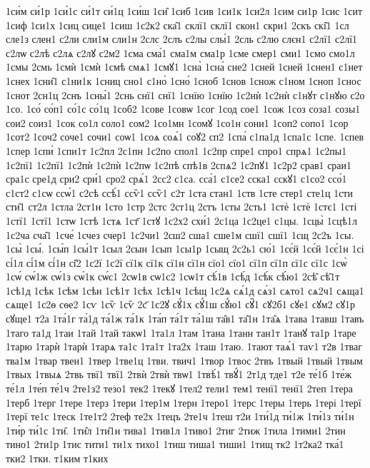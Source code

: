 {1си́м
си́1р
1си́1с
си́1т
си́1ц
1си́ш
1си̑
1сиб
1сив
1си1к
1си2л
1сим
си1р
1сис
1сит
1сиф
1си1х
1сиц
сице1
1сиш
1с2к2
ска̑1
склї1
склї1
скон1
скри1
2скъ
скі̑1
1сл
сле1з
слен1
с2ли
сли1м
сли1н
2слс
2слъ
с2лы
слы́1
2сль
с2лю
слєн1
с2лї1
с2лї1
с2лѡ
с2лѣ
с2лѧ
с2лꙋ
с2м2
1сма
сма́1
сма1м
сма1р
1сме
смер1
сми1
1смо
смо1л
1смы
2смь
1смѝ
1смѝ
1смѣ
смѧ1
1смꙋ1
1сна̀
1сна́
сне2
1сней
1сней
1снен1
с1нет
1снех
1сни̑1
с1ни1к
1сниц
сно1
с1но̀
1сно́
1сноб
1снов
1снож
с1ном
1сноп
1снос
1снот
2сн1ц
2снъ
1сны́1
2снь
снї1
снї1
1снїю
1снїю
1с2нѝ
1с2нѝ
с1нꙋт
с1нꙋю
с2о
1со.
1со́
со́п1
со́1с
со́1ц
1соб2
1сове
1совѡ
1сог
1сод
сое1
1сож
1соз
соза1
созы1
сои2
соиз1
1сок
со1л
соло1
сом2
1со1мн
1сомꙋ
1со1н
сони1
1соп2
сопо1
1сор
1сот2
1соч2
соче1
сочи1
соѡ1
1соѧ
соѧ́1
соꙋ2
сп2
1спа́
с1па1д
1спа1с
1спе.
1спев
1спер
1спи́
1спи1т
1с2пл
2с1пн
1с2по
спол1
1с2пр
спре1
спро1
спрѧ1
1с2пы1
1с2пї1
1с2пї1
1с2пѝ
1с2пѝ
1с2пѡ
1с2пѣ
спѣ1в
2спѧ2
1с2пꙋ1
1с2р2
срав1
сраи1
сра1с
сре1д
сри2
сри́1
сро2
срѧ́1
2сс2
с1са.
сса́1
с1се2
сска1
сскꙋ1
с1со2
ссо́1
с1ст2
с1сѡ
ссѡ́1
с2сѣ
ссѣ́1
ссѷ1
ссѷ1
с2т
1ста
стан1
1ств
1сте
стер1
сте1ц
1сти
сти̑1
ст2л
1стла
2ст1н
1сто
1стр
2стс
2ст1ц
2стъ
1сты
2сть1
1стѐ
1стѐ
1стє1
1сті
1стї1
1стї1
1стѡ
1стѣ
1стѧ
1ст҃
1стꙋ
1с2х2
схи́1
2с1ца
1с2це1
с1цы.
1сцы̀
1сцѣ1л
1с2ча
сча̑1
1сче́
1счез
счер1
1с2чи1
2сш2
сша1
сше1м
сшї1
сшї1
1сщ
2с2ъ
1сы.
1сы̀
1сы́.
1сы́п
1сы́1т
1сыл
2сын
1сып
1сы1р
1сыщ
2с2ь1
сю́1
1сє́й
1сє́й
1сє́1н
1сі
сі́1л
сі́1м
сі́1н
сі̑2
1с2ї
1с2ї
сї1к
сї1к
сї1н
сї1н
сїо1
сїо1
сї1п
сї1п
сї1с
сї1с
1сѡ̀
1сѡ́
сѡ́1ж
сѡ́1з
сѡ́1к
сѡ́с1
2сѡ1в
сѡ1с2
1сѡ1т
сѣ́1в
1сѣ́д
1сѣ́к
сѣ́ю1
2сѣ̑
сѣ̑1т
1сѣ1д
1сѣк
1сѣм
1сѣн
1сѣ1т
1сѣх
1сѣ1ч
1сѣщ
1с2ѧ
сѧ́1д
сѧ́з1
сѧто1
сѧ2ч1
сѧща1
сѧще1
1с2ѳ
сѳе2
1сѵ
1сѷ
1сѷ
2с҃
1с2ꙋ
сꙋ́1х
сꙋ́1ш
сꙋ́ю1
сꙋ̑1
сꙋ2б1
сꙋе1
сꙋм2
сꙋ1р
сꙋще1
т2а
1та́1г
та́1д
та́1ж
та́1к
1та́п
та́1т
та́1ш
та̑в1
та̑1н
1та̑ѧ
1тава
1тавш
1тавъ
1таго
та1д
1таи
1тай
1тай
такѡ1
1та1л
1там
1тана
1танн
тан1т
1танꙋ
та1р
1таре
1тарю
1тарѝ
1тарѝ
1тарѧ
та1с
1та1т
1та2х
1таш
1таю.
1тают
таѧ́1
таѵ1
т2в
1тваг
тва1м
1твар
твен1
1твер
1тве1ц
1тви.
твич1
1твор
1твос
2твъ
1твый
1твый
1твым
1твых
1твыѧ
2твь
твї1
твї1
2твѝ
2твѝ
твѡ1
1твѣ́1
твꙋ́1
2т1д
тде1
т2е
те́1б
1те́ж
те́1л
1те́п
те́1ч
2те1з2
тезо1
тек2
1текꙋ
1тел2
тели1
тем1
тенї1
тенї1
2теп
1тера
1терб
1терг
1тере
1терз
1тери
1тер1м
1терн
1теро1
1терс
1теры
1терь
1тері
1терї
1терї
те1с
1теск
1те1т2
2теф
те2х
1тецъ
2те1ч
1теш
т2и
1ти́1д
ти́1ж
1ти́1з
ти́1н
1ти́р
ти́1с
1ти̑.
1ти̑л
1ти̑1н
тива1
1тив1л
1тиво1
2тиг
2тиж
1тила
1тими1
2тин
тино1
2ти1р
1тис
тити1
ти1х
тихо1
1тиш
тиша1
тиши1
1тищ
тк2
1т2ка2
тка́1
тки2
1тки.
т1ким
т1ких
}

